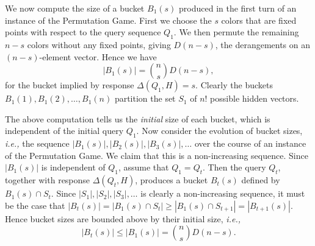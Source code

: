 \documentclass[12pt, a4paper]{article}
\newcommand{\intersect}{\cap}         %
\begin{document}
	We now compute the size of a bucket $B_1(s)$ produced in the first turn of an instance of the Permutation Game. First we choose the $s$ colors that are fixed points with respect to the query sequence $Q_1$. We then permute the remaining $n-s$ colors without any fixed points, giving $D(n - s)$, the derangements on an $(n-s)$-element vector. Hence we have
	\begin{equation*}
		|B_1(s)| = \binom{n}{s}D(n-s),
	\end{equation*}
	for the bucket implied by response $\Delta(Q_1, H) = s$. Clearly the buckets $B_1(1), B_1(2), \ldots, B_1(n)$ partition the set $S_1$ of $n!$ possible hidden vectors.
	
	The above computation tells us the \textit{initial} size of each bucket, which is independent of the initial query $Q_1$. Now consider the evolution of bucket sizes, \textit{i.e.,} the sequence $|B_1(s)|, |B_2(s)|, |B_3(s)|, \ldots$ over the course of an instance of the Permutation Game. We claim that this is a non-increasing sequence. Since $|B_1(s)|$ is independent of $Q_1$, assume that $Q_1 = Q_t$. Then the query $Q_t$, together with response $\Delta(Q_t, H)$, produces a bucket $B_t(s)$ defined by $B_1(s)\intersect S_t$. Since $|S_1|, |S_2|, |S_3|, \ldots$ is clearly a non-increasing sequence, it must be the case that $|B_{t}(s)| = |B_{1}(s)\intersect S_{t}|\ge |B_{1}(s)\intersect S_{t+1}| = |B_{t+1}(s)|$. Hence bucket sizes are bounded above by their initial size, \textit{i.e.,}
	\begin{equation*}
		|B_t(s)|\le |B_1(s)| = \binom{n}{s}D(n-s).
	\end{equation*}
\end{document}
